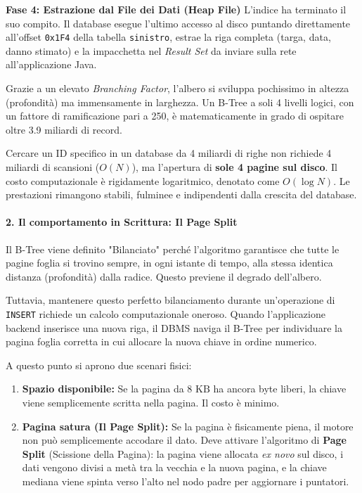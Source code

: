 \begin{example}
\textbf{Fase 4: Estrazione dal File dei Dati (Heap File)}
L'indice ha terminato il suo compito. Il database esegue l'ultimo accesso al disco puntando direttamente all'offset \texttt{0x1F4} della tabella \texttt{sinistro}, estrae la riga completa (targa, data, danno stimato) e la impacchetta nel \textit{Result Set} da inviare sulla rete all'applicazione Java.
\end{example}


Grazie a un elevato \textit{Branching Factor}, l'albero si sviluppa pochissimo in altezza (profondità) ma immensamente in larghezza. Un B-Tree a soli 4 livelli logici, con un fattore di ramificazione pari a 250, è matematicamente in grado di ospitare oltre 3.9 miliardi di record. 

Cercare un ID specifico in un database da 4 miliardi di righe non richiede 4 miliardi di scansioni ($O(N)$), ma l'apertura di \textbf{sole 4 pagine sul disco}. Il costo computazionale è rigidamente logaritmico, denotato come $O(\log N)$. Le prestazioni rimangono stabili, fulminee e indipendenti dalla crescita del database.


\paragraph{2. Il comportamento in Scrittura: Il Page Split}

Il B-Tree viene definito "Bilanciato" perché l'algoritmo garantisce che tutte le pagine foglia si trovino sempre, in ogni istante di tempo, alla stessa identica distanza (profondità) dalla radice. Questo previene il degrado dell'albero.

Tuttavia, mantenere questo perfetto bilanciamento durante un'operazione di \texttt{INSERT} richiede un calcolo computazionale oneroso. Quando l'applicazione backend inserisce una nuova riga, il DBMS naviga il B-Tree per individuare la pagina foglia corretta in cui allocare la nuova chiave in ordine numerico. 

A questo punto si aprono due scenari fisici:

\begin{enumerate}
    \item \textbf{Spazio disponibile:} Se la pagina da $8\text{ KB}$ ha ancora byte liberi, la chiave viene semplicemente scritta nella pagina. Il costo è minimo.
    \item \textbf{Pagina satura (Il Page Split):} Se la pagina è fisicamente piena, il motore non può semplicemente accodare il dato. Deve attivare l'algoritmo di \textbf{Page Split} (Scissione della Pagina): la pagina viene allocata \textit{ex novo} sul disco, i dati vengono divisi a metà tra la vecchia e la nuova pagina, e la chiave mediana viene spinta verso l'alto nel nodo padre per aggiornare i puntatori.
\end{enumerate}

